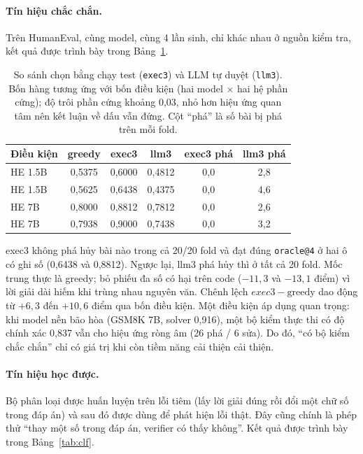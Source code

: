 \documentclass[11pt,a4paper]{article}
\begin{document}
\paragraph{Tín hiệu chắc chắn.}
Trên HumanEval, cùng model, cùng 4 lần sinh, chỉ khác nhau ở nguồn kiểm tra, kết quả được trình bày trong Bảng~\ref{tab:exec}.

\begin{table}[htbp]
\centering
\small
\begin{tabular}{@{}l c c c c c@{}}
\toprule
Điều kiện & greedy & exec3 & llm3 & exec3 phá & llm3 phá\\
\midrule
HE 1.5B  & 0,5375 & 0,6000 & 0,4812 & 0,0 & 2,8\\
HE 1.5B    & 0,5625 & 0,6438 & 0,4375 & 0,0 & 4,6\\
HE 7B      & 0,8000 & 0,8812 & 0,7812 & 0,0 & 2,6\\
HE 7B   & 0,7938 & 0,9000 & 0,7438 & 0,0 & 3,2\\
\bottomrule
\end{tabular}
\caption{So sánh chọn bằng chạy test (\texttt{exec3}) và LLM tự duyệt (\texttt{llm3}). Bốn hàng tương ứng với bốn điều kiện (hai model $\times$ hai hệ phần cứng); độ trôi phần cứng khoảng 0,03, nhỏ hơn hiệu ứng quan tâm nên kết luận về dấu vẫn đứng. Cột “phá” là số bài bị phá trên mỗi fold. }
\label{tab:exec}
\end{table}

exec3 không phá hủy bài nào trong cả 20/20 fold và đạt đúng \texttt{oracle@4} ở hai ô có ghi số (0,6438 và 0,8812). Ngược lại, llm3 phá hủy thì ở tất cả 20 fold. Mốc trung thực là greedy; bỏ phiếu đa số có hại trên code ($-11{,}3$ và $-13{,}1$ điểm) vì lời giải dài hiếm khi trùng nhau nguyên văn. Chênh lệch $exec3-\text{greedy}$ dao động từ $+6{,}3$ đến $+10{,}6$ điểm qua bốn điều kiện. Một điều kiện áp dụng quan trọng: khi model nền bão hòa (GSM8K 7B, solver 0,916), một bộ kiểm thực thi có độ chính xác 0,837 vẫn cho hiệu ứng ròng âm (26 phá / 6 sửa). Do đó, “có bộ kiểm chắc chắn” chỉ có giá trị khi còn tiềm năng cải thiện cải thiện.

\paragraph{Tín hiệu học được.}
Bộ phân loại được huấn luyện trên lỗi tiêm (lấy lời giải đúng rồi đổi một chữ số trong đáp án) và sau đó được dùng để phát hiện lỗi thật. Đây cũng chính là phép thử “thay một số trong đáp án, verifier có thấy không”. Kết quả được trình bày trong Bảng~\ref{tab:clf}.
\end{document}
